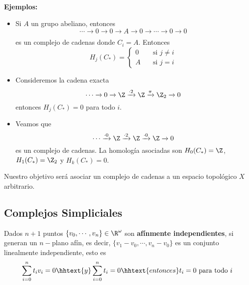 \documentclass{article}
\begin{document}
\vspace{2mm}
\noindent\textbf{Ejemplos:}
\begin{itemize}
    \item Si $A$ un grupo abeliano, entonces
    \begin{equation*}
        \cdots\xrightarrow[]{}0\xrightarrow[]{}0\xrightarrow[]{}A\xrightarrow[]{}
        0\xrightarrow[]{}\cdots\xrightarrow[]{}0\xrightarrow[]{}0
    \end{equation*}
    es un complejo de cadenas donde $C_{i}=A$. Entonces
    \begin{equation*}
        H_{j}(C_{*})=\begin{cases}
            0 & \quad\text{si }j\neq i \\
            A & \quad\text{si }j=i
        \end{cases}
    \end{equation*}

    \item Consideremos la cadena exacta
    \begin{equation*}
        \cdots\xrightarrow[]{}0\xrightarrow[]{}\Z\xrightarrow[]{\cdot2}
        \Z\xrightarrow[]{\pi}\Z_{2}\xrightarrow[]{}0
    \end{equation*}
    entonces $H_{j}(C_{*})=0$ para todo $i$.

    \item Veamos que
    \begin{equation*}
        \cdots\xrightarrow[]{\cdot0}\Z\xrightarrow[]{\cdot2}\Z\xrightarrow[]{\cdot0}
        \Z\xrightarrow[]{}0
    \end{equation*}
    es un complejo de cadenas. La homología asociadas son $H_{0}(C_{*})=\Z$, $H_{1}(C_{*})=\Z_{2}$
    y $H_{k}(C_{*})=0$.
\end{itemize}

\noindent Nuestro objetivo será asociar un complejo de cadenas a un espacio topológico $X$ 
arbitrario.

\subsection{Complejos Simpliciales}
\begin{dfn}
    Dados $n+1$ puntos $\{v_{0},\cdots,v_{n}\}\in\R^{\omega}$ son \textbf{afínmente 
    independientes}, si generan un $n-$plano afín, es decir, $\{v_{1}-v_{0},\cdots,v_{n}-v_{0}\}$
    es un conjunto linealmente independiente, esto es
    \begin{equation*}
        \sum_{i=0}^{n}t_{i}v_{i}=0\hhtext{y}\sum_{i=0}^{n}t_{i}=0
        \hhtext{entonces}t_{i}=0\text{ para todo }i
    \end{equation*}
\end{dfn}
\end{document}
